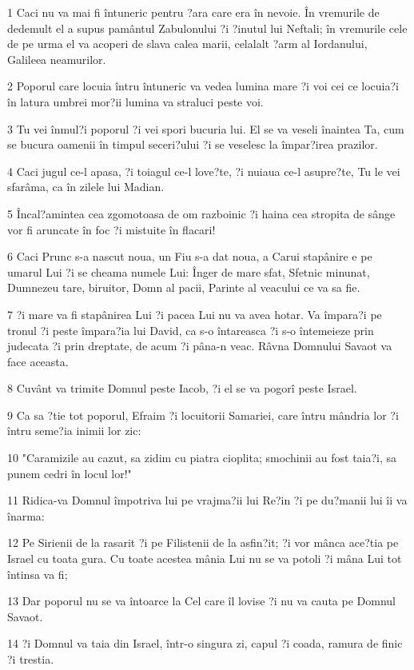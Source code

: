 \par 1 Caci nu va mai fi întuneric pentru ?ara care era în nevoie. În vremurile de dedemult el a supus pamântul Zabulonului ?i ?inutul lui Neftali; în vremurile cele de pe urma el va acoperi de slava calea marii, celalalt ?arm al Iordanului, Galileea neamurilor.
\par 2 Poporul care locuia întru întuneric va vedea lumina mare ?i voi cei ce locuia?i în latura umbrei mor?ii lumina va straluci peste voi.
\par 3 Tu vei înmul?i poporul ?i vei spori bucuria lui. El se va veseli înaintea Ta, cum se bucura oamenii în timpul seceri?ului ?i se veselesc la împar?irea prazilor.
\par 4 Caci jugul ce-l apasa, ?i toiagul ce-l love?te, ?i nuiaua ce-l asupre?te, Tu le vei sfarâma, ca în zilele lui Madian.
\par 5 Încal?amintea cea zgomotoasa de om razboinic ?i haina cea stropita de sânge vor fi aruncate în foc ?i mistuite în flacari!
\par 6 Caci Prunc s-a nascut noua, un Fiu s-a dat noua, a Carui stapânire e pe umarul Lui ?i se cheama numele Lui: Înger de mare sfat, Sfetnic minunat, Dumnezeu tare, biruitor, Domn al pacii, Parinte al veacului ce va sa fie.
\par 7 ?i mare va fi stapânirea Lui ?i pacea Lui nu va avea hotar. Va împara?i pe tronul ?i peste împara?ia lui David, ca s-o întareasca ?i s-o întemeieze prin judecata ?i prin dreptate, de acum ?i pâna-n veac. Râvna Domnului Savaot va face aceasta.
\par 8 Cuvânt va trimite Domnul peste Iacob, ?i el se va pogorî peste Israel.
\par 9 Ca sa ?tie tot poporul, Efraim ?i locuitorii Samariei, care întru mândria lor ?i întru seme?ia inimii lor zic:
\par 10 "Caramizile au cazut, sa zidim cu piatra cioplita; smochinii au fost taia?i, sa punem cedri în locul lor!"
\par 11 Ridica-va Domnul împotriva lui pe vrajma?ii lui Re?in ?i pe du?manii lui îi va înarma:
\par 12 Pe Sirienii de la rasarit ?i pe Filistenii de la asfin?it; ?i vor mânca ace?tia pe Israel cu toata gura. Cu toate acestea mânia Lui nu se va potoli ?i mâna Lui tot întinsa va fi;
\par 13 Dar poporul nu se va întoarce la Cel care îl lovise ?i nu va cauta pe Domnul Savaot.
\par 14 ?i Domnul va taia din Israel, într-o singura zi, capul ?i coada, ramura de finic ?i trestia.
